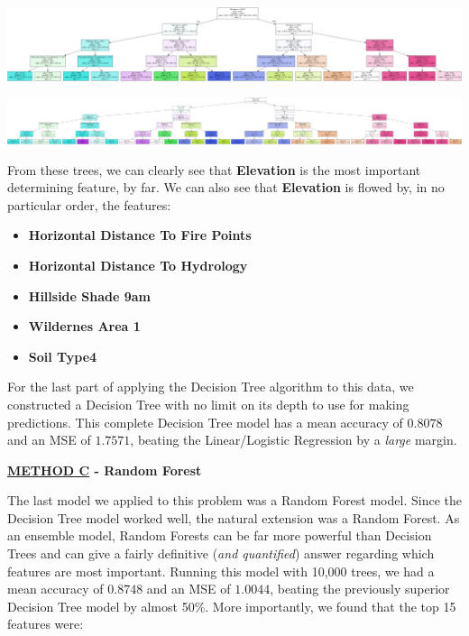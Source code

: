 \documentclass{article}[12pt]
\numberwithin{equation}{subsection}
\begin{document}
\begin{center}
\includegraphics[width=7in]{../decTree2.png}
\end{center}

\begin{center}
\includegraphics[width=7in]{../decTree3.png}
\end{center}
\begin{flushleft}


From these trees, we can clearly see that \textbf{Elevation} is the most important determining feature, by far.  We can also see that \textbf{Elevation} is flowed by, in no particular order, the features:

\begin{itemize}
\item \textbf{Horizontal Distance To Fire Points}
\item \textbf{Horizontal Distance To Hydrology}
\item \textbf{Hillside Shade 9am}
\item \textbf{Wildernes Area 1}
\item \textbf{Soil Type4}
\end{itemize}

For the last part of applying the Decision Tree algorithm to this data, we constructed a Decision Tree with no limit on its depth to use for making predictions.  This complete Decision Tree model has a mean accuracy of $0.8078$ and an MSE of $1.7571$, beating the Linear/Logistic Regression by a \emph{large} margin.


\vspace{1.5in}

\begin{large} \textbf{\underline{METHOD C} - Random Forest} \end{large}

The last model we applied to this problem was a Random Forest model.  Since the Decision Tree model worked well, the natural extension was a Random Forest.  As an ensemble model, Random Forests can be far more powerful than Decision Trees and can give a fairly definitive (\emph{and quantified}) answer regarding which features are most important.  Running this model with 10,000 trees, we had a mean accuracy of $0.8748$ and an MSE of $1.0044$, beating the previously superior Decision Tree model by almost 50\%.  More importantly, we found that the top 15 features were:


\end{flushleft}
\end{document}
